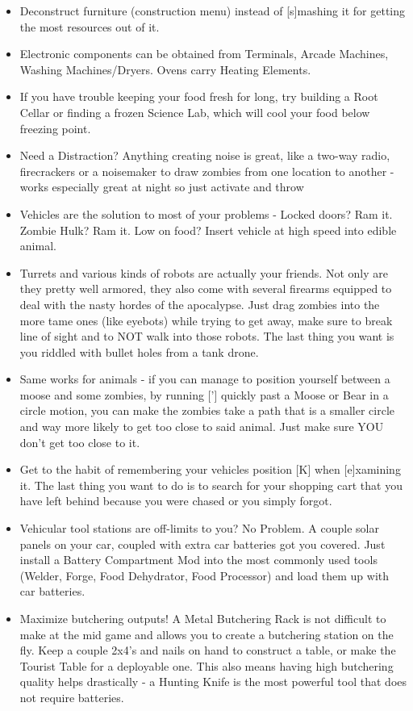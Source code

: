 \documentclass[11pt]{report}
\begin{document}
\begin{itemize}
\item Deconstruct furniture (construction menu) instead of [s]mashing it for getting the most resources out of it.
\item Electronic components can be obtained from Terminals, Arcade Machines, Washing Machines/Dryers. Ovens carry Heating Elements.
\item If you have trouble keeping your food fresh for long, try building a Root Cellar or finding a frozen Science Lab, which will cool your food below freezing point.
\item Need a Distraction? Anything creating noise is great, like a two-way radio, firecrackers or a noisemaker to draw zombies from one location to another - works especially great at night so just activate and throw
\item Vehicles are the solution to most of your problems - Locked doors? Ram it. Zombie Hulk? Ram it. Low on food? Insert vehicle at high speed into edible animal.
\item Turrets and various kinds of robots are actually your friends. Not only are they pretty well armored, they also come with several firearms equipped to deal with the nasty hordes of the apocalypse. Just drag zombies into the more tame ones (like eyebots) while trying to get away, make sure to break line of sight and to NOT walk into those robots. The last thing you want is you riddled with bullet holes from a tank drone.
\item Same works for animals - if you can manage to position yourself between a moose and some zombies, by running ['] quickly past a Moose or Bear in a circle motion, you can make the zombies take a path that is a smaller circle and way more likely to get too close to said animal. Just make sure YOU don't get too close to it.
\item Get to the habit of remembering your vehicles position [K] when [e]xamining it. The last thing you want to do is to search for your shopping cart that you have left behind because you were chased or you simply forgot.
\item Vehicular tool stations are off-limits to you? No Problem. A couple solar panels on your car, coupled with extra car batteries got you covered. Just install a Battery Compartment Mod into the most commonly used tools (Welder, Forge, Food Dehydrator, Food Processor) and load them up with car batteries.
\item Maximize butchering outputs! A Metal Butchering Rack is not difficult to make at the mid game and allows you to create a butchering station on the fly. Keep a couple 2x4's and nails on hand to construct a table, or make the Tourist Table for a deployable one. This also means having high butchering quality helps drastically - a Hunting Knife is the most powerful tool that does not require batteries.

\end{itemize}
\end{document}
